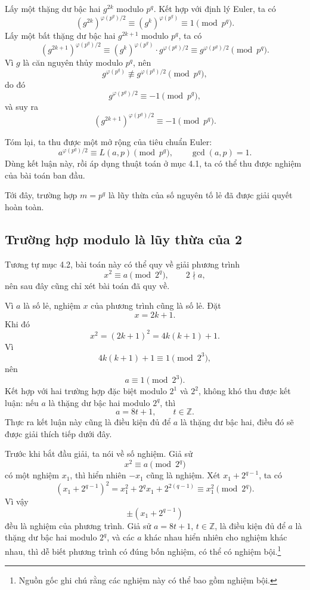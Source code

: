 \documentclass[11pt]{article}
\begin{document}
Lấy một thặng dư bậc hai $g^{2k}$ modulo $p^q$. Kết hợp với định lý Euler, ta
có
\[
  (g^{2k})^{\varphi(p^q)/2}
  \equiv (g^k)^{\varphi(p^q)}\equiv 1\pmod {p^q}.
\]
Lấy một bất thặng dư bậc hai $g^{2k+1}$ modulo $p^q$, ta có
\[
  (g^{2k+1})^{\varphi(p^q)/2}
  \equiv (g^k)^{\varphi(p^q)}\cdot g^{\varphi(p^q)/2}
  \equiv g^{\varphi(p^q)/2}\pmod {p^q}.
\]
Vì $g$ là căn nguyên thủy modulo $p^q$, nên
\[
  g^{\varphi(p^q)}\not\equiv g^{\varphi(p^q)/2}\pmod {p^q},
\]
do đó
\[
  g^{\varphi(p^q)/2}\equiv -1\pmod {p^q},
\]
và suy ra
\[
  (g^{2k+1})^{\varphi(p^q)/2}\equiv -1\pmod {p^q}.
\]

Tóm lại, ta thu được một mở rộng của tiêu chuẩn Euler:
\[
  a^{\varphi(p^q)/2}\equiv L(a,p)\pmod {p^q},
  \qquad \gcd(a,p)=1.
\]
Dùng kết luận này, rồi áp dụng thuật toán ở mục 4.1, ta có thể thu được nghiệm
của bài toán ban đầu.

Tới đây, trường hợp $m=p^q$ là lũy thừa của số nguyên tố lẻ đã được giải quyết
hoàn toàn.

\subsection{Trường hợp modulo là lũy thừa của 2}

Tương tự mục 4.2, bài toán này có thể quy về giải phương trình
\[
  x^2\equiv a\pmod {2^q},\qquad 2\nmid a,
\]
nên sau đây cũng chỉ xét bài toán đã quy về.

Vì $a$ là số lẻ, nghiệm $x$ của phương trình cũng là số lẻ. Đặt
\[
  x=2k+1.
\]
Khi đó
\[
  x^2=(2k+1)^2=4k(k+1)+1.
\]
Vì
\[
  4k(k+1)+1\equiv 1\pmod {2^3},
\]
nên
\[
  a\equiv 1\pmod {2^3}.
\]
Kết hợp với hai trường hợp đặc biệt modulo $2^1$ và $2^2$, không khó thu được
kết luận: nếu $a$ là thặng dư bậc hai modulo $2^q$, thì
\[
  a=8t+1,\qquad t\in\mathbb Z.
\]
Thực ra kết luận này cũng là điều kiện đủ để $a$ là thặng dư bậc hai, điều đó
sẽ được giải thích tiếp dưới đây.

Trước khi bắt đầu giải, ta nói về số nghiệm. Giả sử
\[
  x^2\equiv a\pmod {2^q}
\]
có một nghiệm $x_1$, thì hiển nhiên $-x_1$ cũng là nghiệm. Xét
$x_1+2^{q-1}$, ta có
\[
  (x_1+2^{q-1})^2=x_1^2+2^q x_1+2^{2(q-1)}
  \equiv x_1^2\pmod {2^q}.
\]
Vì vậy
\[
  \pm(x_1+2^{q-1})
\]
đều là nghiệm của phương trình. Giả sử $a=8t+1$, $t\in\mathbb Z$, là điều
kiện đủ để $a$ là thặng dư bậc hai modulo $2^q$, và các $a$ khác nhau hiển
nhiên cho nghiệm khác nhau, thì dễ biết phương trình có đúng bốn nghiệm, có
thể có nghiệm bội.\footnote{Nguồn gốc ghi chú rằng các nghiệm này có thể bao
gồm nghiệm bội.}
\end{document}
